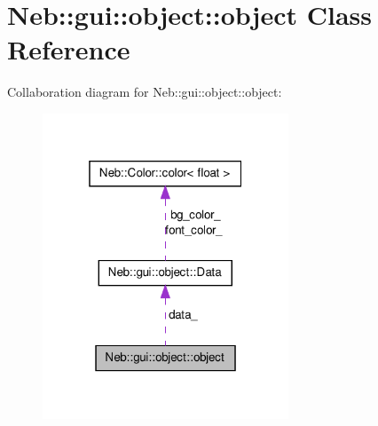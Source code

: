\hypertarget{classNeb_1_1gui_1_1object_1_1object}{\section{\-Neb\-:\-:gui\-:\-:object\-:\-:object \-Class \-Reference}
\label{classNeb_1_1gui_1_1object_1_1object}
}


\-Collaboration diagram for \-Neb\-:\-:gui\-:\-:object\-:\-:object\-:\nopagebreak
\begin{figure}[H]
\begin{center}
\leavevmode
\includegraphics[width=208pt]{classNeb_1_1gui_1_1object_1_1object__coll__graph}
\end{center}
\end{figure}
